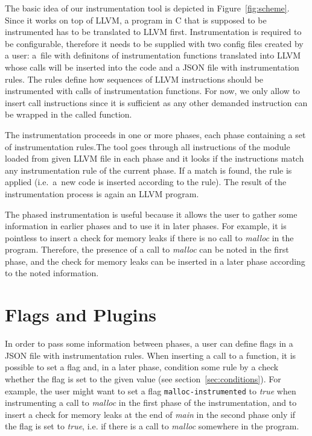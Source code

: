 The basic idea of our instrumentation tool is depicted in
Figure~\ref{fig:scheme}. Since it works on top of LLVM, a program in C that is
supposed to be instrumented has to be translated to LLVM first. Instrumentation
is required to be configurable, therefore it needs to be supplied with two
config files created by a user: a~file with definitons of instrumentation
functions translated into LLVM whose calls will be inserted into the code and a
JSON file with instrumentation rules. The rules define how sequences of LLVM
instructions should be instrumented with calls of instrumentation functions.
For now, we only allow to insert call instructions since it is sufficient as
any other demanded instruction can be wrapped in the called function.

The instrumentation proceeds in one or more phases, each phase containing a set
of instrumentation rules.The tool goes through all instructions of the module
loaded from given LLVM file in each phase and it looks if the instructions
match any instrumentation rule of the current phase. If a match is found, the
rule is applied (i.e.~a~new code is inserted according to the rule). The result
of the instrumentation process is again an LLVM program.

The phased instrumentation is useful because it allows the user to gather some
information in earlier phases and to use it in later phases. For example, it is
pointless to insert a check for memory leaks if there is no call to
\emph{malloc} in the program. Therefore, the presence of a call to
\emph{malloc} can be noted in the first phase, and the check for memory leaks
can be inserted in a later phase according to the noted information.

\section{Flags and Plugins}

In order to pass some information between phases, a user can define flags in a
JSON file with instrumentation rules. When inserting a call to a function, it
is possible to set a flag and, in a later phase, condition some rule by a check
whether the flag is set to the given value (see section~\ref{sec:conditions}).
For example, the user might want to set a flag \texttt{malloc-instrumented} to
\emph{true} when instrumenting a call to \emph{malloc} in the first phase of
the instrumentation, and to insert a check for memory leaks at the end of
\emph{main} in the second phase only if the flag is set to \emph{true}, i.e. if
there is a call to \emph{malloc} somewhere in the program.

